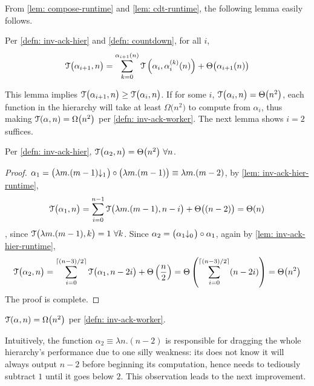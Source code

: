 From \cref{lem: compose-runtime} and \cref{lem: cdt-runtime}, the following lemma easily follows.
\begin{lem} \label{lem: inv-ack-hier-runtime}
	Per \cref{defn: inv-ack-hier} and \cref{defn: countdown}, for all $i$, 
	\begin{equation*}
	\mathcal{T}\big(\alpha_{i+1}, n\big) = \sum_{k=0}^{\alpha_{i+1}(n)}\mathcal{T}\left(\alpha_i, \alpha_i^{(k)}(n)\right) + \Theta\big(\alpha_{i+1}(n)\big)
	\end{equation*}
\end{lem}
This lemma implies $\mathcal{T}\big(\alpha_{i+1}, n\big) \ge \mathcal{T}\big(\alpha_i, n\big)$. If for some $i$, $\mathcal{T}\big(\alpha_i, n\big) = \Theta\big(n^2\big)$, each function in the hierarchy will take at least $\Omega\big(n^2\big)$ to compute from $\alpha_i$, thus making $\mathcal{T}(\alpha, n) = \Omega\big(n^2\big)$ per \cref{defn: inv-ack-worker}. The next lemma shows $i = 2$ suffices.
\begin{lem}
	Per \cref{defn: inv-ack-hier}, $\mathcal{T}\big(\alpha_2, n\big) = \Theta\big(n^2\big) \ \forall n$. 
\end{lem}
\begin{proof}
	$\alpha_1 = \big(\cdt{\lambda m.(m-1)}{1}\big)\circ \big(\lambda m.(m-1)\big) \equiv \lambda m.(m - 2)$, by \cref{lem: inv-ack-hier-runtime},
	\begin{equation*}
	\mathcal{T}\big(\alpha_1, n\big) = \sum_{i=0}^{n-1} \mathcal{T}\big(\lambda m.(m-1), n - i\big) + \Theta\big((n-2)\big) = \Theta(n)
	\end{equation*}
	, since $\mathcal{T}\big(\lambda m.(m-1), k\big) = 1 \ \forall k$. Since $\alpha_2 = \big(\cdt{\alpha_1}{0}\big)\circ \alpha_1 $, again by \cref{lem: inv-ack-hier-runtime},
	\begin{equation*}
	\mathcal{T}\big(\alpha_2, n\big)
	= \sum_{i=0}^{\lceil (n-3)/2 \rceil} \mathcal{T} \big(\alpha_1, n-2i\big) + \Theta\left(\frac{n}{2}\right)
	= \Theta\left( \sum_{i=0}^{\lceil (n-3)/2 \rceil}(n - 2i) \right)
	= \Theta\big(n^2\big)
	\end{equation*}
	The proof is complete.
\end{proof}
\begin{col}
	$\mathcal{T}(\alpha, n) = \Omega\big(n^2\big)$ per \cref{defn: inv-ack-worker}.
\end{col}
Intuitively, the function $\alpha_2 \equiv \lambda n.(n-2)$ is responsible for dragging the whole hierarchy's performance due to one silly weakness: its does not know it will always output $n-2$ before beginning its computation, hence needs to tediously subtract $1$ until it goes below $2$. This observation leads to the next improvement.

